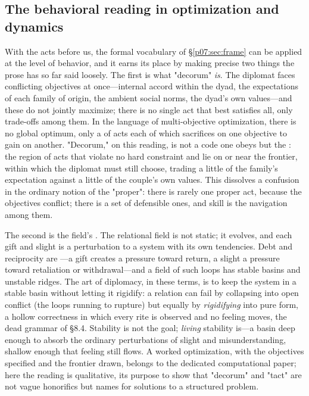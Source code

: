 \documentclass[11pt,a4paper]{article}
\newcommand{\emb}[1]{\textcolor{rose}{\oldtextbf{#1}}}
\newcommand{\xref}[1]{\textcolor{rose}{\S\ref{#1}}}
\newcommand{\pinkref}[1]{\textcolor{rose}{#1}}
\begin{document}
\subsection{The behavioral reading in optimization and dynamics}
With the acts before us, the formal vocabulary of \xref{p07:sec:frame} can be applied at the level of behavior, and it earns its place by making precise two things the prose has so far said loosely. The first is what "decorum" \emph{is}. The diplomat faces conflicting objectives at once---internal accord within the dyad, the expectations of each family of origin, the ambient social norms, the dyad's own values---and these do not jointly maximize; there is no single act that best satisfies all, only trade-offs among them. In the language of multi-objective optimization, there is no global optimum, only a \emb{Pareto frontier} of acts each of which sacrifices on one objective to gain on another. "Decorum," on this reading, is not a code one obeys but the \emb{feasible set}: the region of acts that violate no hard constraint and lie on or near the frontier, within which the diplomat must still choose, trading a little of the family's expectation against a little of the couple's own values. This dissolves a confusion in the ordinary notion of the "proper": there is rarely one proper act, because the objectives conflict; there is a set of defensible ones, and skill is the navigation among them.

The second is the field's \emb{dynamics}. The relational field is not static; it evolves, and each gift and slight is a perturbation to a system with its own tendencies. Debt and reciprocity are \emb{feedback loops}---a gift creates a pressure toward return, a slight a pressure toward retaliation or withdrawal---and a field of such loops has stable basins and unstable ridges. The art of diplomacy, in these terms, is to keep the system in a stable basin without letting it rigidify: a relation can fail by collapsing into open conflict (the loops running to rupture) but equally by \emph{rigidifying} into pure form, a hollow correctness in which every rite is observed and no feeling moves, the dead grammar of \pinkref{§8.4.} Stability is not the goal; \emph{living} stability is---a basin deep enough to absorb the ordinary perturbations of slight and misunderstanding, shallow enough that feeling still flows. A worked optimization, with the objectives specified and the frontier drawn, belongs to the dedicated computational paper; here the reading is qualitative, its purpose to show that "decorum" and "tact" are not vague honorifics but names for solutions to a structured problem.
\end{document}

